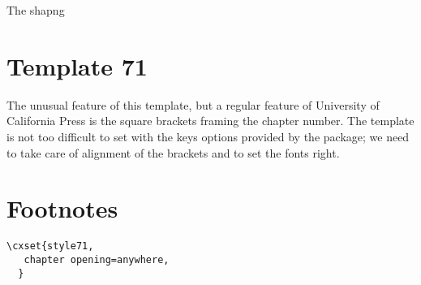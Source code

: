 The shapng

\section{Template 71}

The unusual feature of this template, but a regular feature of University of California Press is the square brackets framing the chapter number. The template is not too difficult to set with the keys options provided by the  package; we need to take care of alignment of the brackets and to set the fonts right.

\section{Footnotes}




\example
\begin{verbatim}
\cxset{style71,
   chapter opening=anywhere,
  }
\end{verbatim}



